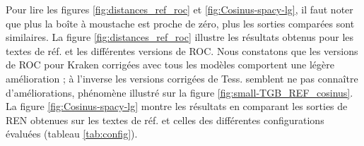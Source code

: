 Pour lire les figures \ref{fig:distances_ref_roc} et \ref{fig:Cosinus-spacy-lg}, il faut noter que plus la boîte à moustache est proche de zéro, plus les sorties comparées sont similaires. La figure \ref{fig:distances_ref_roc} illustre les résultats obtenus pour les textes de réf. et les différentes versions de ROC. Nous constatons que les versions de ROC pour Kraken corrigées avec tous les modèles comportent une légère amélioration ; à l'inverse les versions corrigées de Tess. semblent ne pas connaître d'améliorations, phénomène illustré sur la figure \ref{fig:small-TGB_REF_cosinus}. 
La figure \ref{fig:Cosinus-spacy-lg} montre les résultats en comparant les sorties de REN obtenues sur les textes de réf. et celles des différentes configurations évaluées (tableau \ref{tab:config}). %
